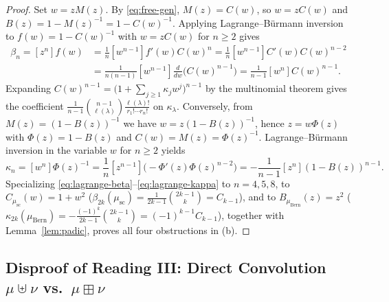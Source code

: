\documentclass[11pt,a4paper]{article}
\theoremstyle{definition}
\theoremstyle{remark}
\newcommand{\Bern}{\mu_{\mathrm{Bern}}}
\newcommand{\Wig}{\mu_{\mathrm{sc}}}
\begin{document}
\begin{proof}
Set $w = z M(z)$. By \eqref{eq:free-gen}, $M(z) = C(w)$, so $w = z C(w)$ and $B(z) = 1 - M(z)^{-1} = 1 - C(w)^{-1}$. Applying Lagrange--B\"urmann inversion to $f(w) = 1 - C(w)^{-1}$ with $w = z C(w)$ for $n \ge 2$ gives
\[
  \begin{aligned}
    \beta_n = [z^n] f(w) &= \frac{1}{n} [w^{n-1}] f'(w) C(w)^n = \frac{1}{n} [w^{n-1}] C'(w) C(w)^{n-2}\\
    &= \frac{1}{n(n-1)} [w^{n-1}] \frac{d}{dw}\bigl(C(w)^{n-1}\bigr) = \frac{1}{n-1}[w^n] C(w)^{n-1}.
  \end{aligned}
\]
Expanding $C(w)^{n-1} = \bigl(1 + \sum_{j \ge 1} \kappa_j w^j\bigr)^{n-1}$ by the multinomial theorem gives the coefficient $\frac{1}{n-1}\binom{n-1}{\ell(\lambda)} \frac{\ell(\lambda)!}{r_1!\cdots r_n!}$ on $\kappa_\lambda$. Conversely, from $M(z) = (1 - B(z))^{-1}$ we have $w = z(1 - B(z))^{-1}$, hence $z = w \Phi(z)$ with $\Phi(z) = 1 - B(z)$ and $C(w) = M(z) = \Phi(z)^{-1}$. Lagrange--B\"urmann inversion in the variable $w$ for $n \ge 2$ yields
\[
  \kappa_n = [w^n] \Phi(z)^{-1} = \frac{1}{n}[z^{n-1}] \bigl(-\Phi'(z)\Phi(z)^{n-2}\bigr) = -\frac{1}{n-1}[z^n](1 - B(z))^{n-1}.
\]
Specializing \eqref{eq:lagrange-beta}--\eqref{eq:lagrange-kappa} to $n = 4, 5, 8$, to $C_{\Wig}(w) = 1 + w^2$ ($\beta_{2k}(\Wig) = \frac{1}{2k-1}\binom{2k-1}{k} = C_{k-1}$), and to $B_{\Bern}(z) = z^2$ ($\kappa_{2k}(\Bern) = -\frac{(-1)^k}{2k-1}\binom{2k-1}{k} = (-1)^{k-1} C_{k-1}$), together with Lemma~\ref{lem:padic}, proves all four obstructions in (b).
\end{proof}

\subsection{Disproof of Reading III: Direct Convolution \texorpdfstring{$\mu \uplus \nu$ vs.\ $\mu \boxplus \nu$}{Boolean vs. Free Convolution}}
\end{document}
